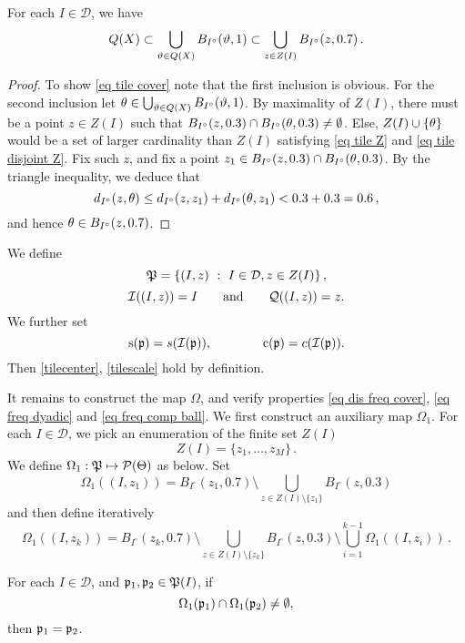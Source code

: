{\begin{lemma}
\label{frequency ball cover}
    For each $I \in \mathcal{D}$, we have
    \begin{equation}
        \label{eq tile cover}
        {Q}(X) \subset  \bigcup_{\vartheta \in {Q}(X)} B_{I^\circ}(\vartheta, 1) \subset \bigcup_{z \in Z(I)} B_{I^\circ}(z, 0.7)\,.
    \end{equation}
\end{lemma}

\begin{proof}
    To show \eqref{eq tile cover} note that the first inclusion is obvious. For the second inclusion let $\theta \in  \bigcup_{\vartheta \in {Q}(X)} B_{I^\circ}(\vartheta, 1)$. By maximality of $Z(I)$, there must be a point $z \in Z(I)$ such that $B_{I^\circ}(z, 0.3) \cap B_{I^\circ}(\theta, 0.3) \ne \emptyset$. Else, $Z(I) \cup \{\theta\}$ would be a set of larger cardinality than $Z(I)$ satisfying \eqref{eq tile Z} and \eqref{eq tile disjoint Z}. Fix such $z$, and fix a point $z_1 \in B_{I^\circ}(z, 0.3) \cap B_{I^\circ}(\theta, 0.3)$. By the triangle inequality, we deduce that
    $$
        d_{I^\circ}(z,\theta) \le d_{I^\circ}(z,z_1) + d_{I^\circ}(\theta, z_1) < 0.3 + 0.3 = 0.6\,,
    $$
    and hence $\theta \in B_{I^\circ}(z, 0.7)$.
\end{proof}

We define
$$
    \mathfrak P = \{(I, z) \ : \ I \in \mathcal{D}, z \in Z(I)\}\,,
$$
$$\mathcal{I}((I, z)) = I\qquad \text{and} \qquad \mathcal{Q}((I, z)) = z.$$ We further set $$\mathrm{s}(\mathfrak p) = s(\mathcal{I}(\mathfrak p)),\qquad \qquad \mathrm{c}(\mathfrak p) = c(\mathcal{I}(\mathfrak p)).$$ Then \eqref{tilecenter}, \eqref{tilescale} hold by definition.

It remains to construct the map $\Omega$, and verify properties \eqref{eq dis freq cover}, \eqref{eq freq dyadic} and
\eqref{eq freq comp ball}. We first construct an auxiliary map $\Omega_1$. For each $I \in \mathcal{D}$, we pick an enumeration of the finite set $Z(I)$
$$
    Z(I) = \{z_1, \dotsc, z_M\}\,.
$$
We define {$\Omega_1:\mathfrak P \mapsto \mathcal{P}(\Theta) $ as below}. Set
$$
    \Omega_1((I, z_1)) = B_{I^\circ}(z_1, 0.7) \setminus \bigcup_{z \in Z(I)\setminus \{z_1\}} B_{I^\circ}(z, 0.3)
$$
and then define iteratively
\begin{equation}
    \label{eq def omega1}
    \Omega_1((I, z_k)) = B_{I^\circ}(z_k, 0.7) \setminus \bigcup_{z \in Z(I) \setminus \{z_k\}} B_{I^\circ}(z, 0.3) \setminus \bigcup_{i=1}^{k-1} \Omega_1((I, z_i))\,.
\end{equation}
\begin{lemma}
    \label{disjoint frequency cubes}
    For each $I \in \mathcal{D}$, and $\mathfrak p_1, \mathfrak p_2\in \mathfrak P(I)$, if $$\Omega_1(\mathfrak p_1)\cap \Omega_1(\mathfrak p_2)\neq \emptyset,$$ then $\mathfrak p_1=\mathfrak p_2$.
\end{lemma}

}
